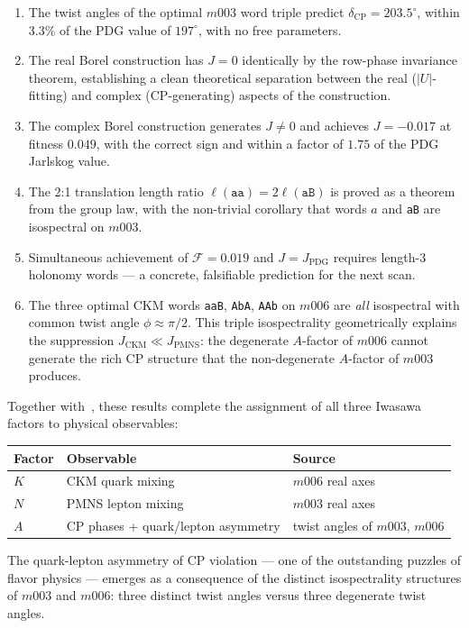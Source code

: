 \documentclass[floatfix,aps,prd,twocolumn,showpacs,superscriptaddress,longbibliography]{revtex4-2}
\begin{document}
\begin{enumerate}
\item The twist angles of the optimal $m003$ word triple predict
$\delta_{\mathrm{CP}} = 203.5^\circ$, within $3.3\%$ of the PDG value
of $197^\circ$, with no free parameters.

\item The real Borel construction has $J = 0$ identically by the
row-phase invariance theorem, establishing a clean theoretical
separation between the real ($|U|$-fitting) and complex
(CP-generating) aspects of the construction.

\item The complex Borel construction generates $J \neq 0$ and
achieves $J = -0.017$ at fitness $0.049$, with the correct sign
and within a factor of $1.75$ of the PDG Jarlskog value.

\item The 2:1 translation length ratio $\ell(\texttt{aa}) = 2\ell(\texttt{aB})$
is proved as a theorem from the group law, with the non-trivial
corollary that words $a$ and \texttt{aB} are isospectral on $m003$.

\item Simultaneous achievement of $\mathcal{F} = 0.019$ and
$J = J_{\mathrm{PDG}}$ requires length-3 holonomy words — a
concrete, falsifiable prediction for the next scan.

\item The three optimal CKM words \texttt{aaB}, \texttt{AbA},
\texttt{AAb} on $m006$ are \emph{all} isospectral with common
twist angle $\phi \approx \pi/2$. This triple isospectrality
geometrically explains the suppression
$J_{\mathrm{CKM}} \ll J_{\mathrm{PMNS}}$: the degenerate
$A$-factor of $m006$ cannot generate the rich CP structure
that the non-degenerate $A$-factor of $m003$ produces.
\end{enumerate}

Together with~\cite{Gentry:CKM,Gentry:PMNS}, these results
complete the assignment of all three Iwasawa factors to
physical observables:
\begin{center}
\begin{tabular}{lll}
\toprule
Factor & Observable & Source \\
\midrule
$K$ & CKM quark mixing & $m006$ real axes \\
$N$ & PMNS lepton mixing & $m003$ real axes \\
$A$ & CP phases + quark/lepton asymmetry & twist angles of $m003$, $m006$ \\
\bottomrule
\end{tabular}
\end{center}
The quark-lepton asymmetry of CP violation --- one of the
outstanding puzzles of flavor physics --- emerges as a
consequence of the distinct isospectrality structures of
$m003$ and $m006$: three distinct twist angles versus
three degenerate twist angles.
\end{document}

